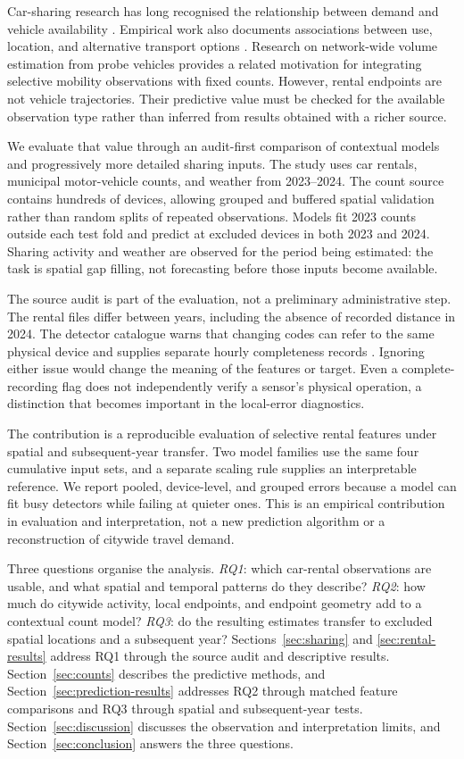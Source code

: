\documentclass{interact}
\begin{document}
Car-sharing research has long recognised the relationship between demand and vehicle availability \citep{jorge2013}. Empirical work also documents associations between use, location, and alternative transport options \citep{becker2017}. Research on network-wide volume estimation from probe vehicles \citep{eisinga2025} provides a related motivation for integrating selective mobility observations with fixed counts. However, rental endpoints are not vehicle trajectories. Their predictive value must be checked for the available observation type rather than inferred from results obtained with a richer source.

We evaluate that value through an audit-first comparison of contextual models and progressively more detailed sharing inputs. The study uses car rentals, municipal motor-vehicle counts, and weather from 2023--2024. The count source contains hundreds of devices, allowing grouped and buffered spatial validation rather than random splits of repeated observations. Models fit 2023 counts outside each test fold and predict at excluded devices in both 2023 and 2024. Sharing activity and weather are observed for the period being estimated: the task is spatial gap filling, not forecasting before those inputs become available.

The source audit is part of the evaluation, not a preliminary administrative step. The rental files differ between years, including the absence of recorded distance in 2024. The detector catalogue warns that changing codes can refer to the same physical device and supplies separate hourly completeness records \citep{bolognaLoops,bolognaAccuracy}. Ignoring either issue would change the meaning of the features or target. Even a complete-recording flag does not independently verify a sensor's physical operation, a distinction that becomes important in the local-error diagnostics.

The contribution is a reproducible evaluation of selective rental features under spatial and subsequent-year transfer. Two model families use the same four cumulative input sets, and a separate scaling rule supplies an interpretable reference. We report pooled, device-level, and grouped errors because a model can fit busy detectors while failing at quieter ones. This is an empirical contribution in evaluation and interpretation, not a new prediction algorithm or a reconstruction of citywide travel demand.

Three questions organise the analysis. \emph{RQ1}: which car-rental observations are usable, and what spatial and temporal patterns do they describe? \emph{RQ2}: how much do citywide activity, local endpoints, and endpoint geometry add to a contextual count model? \emph{RQ3}: do the resulting estimates transfer to excluded spatial locations and a subsequent year? Sections~\ref{sec:sharing} and \ref{sec:rental-results} address RQ1 through the source audit and descriptive results. Section~\ref{sec:counts} describes the predictive methods, and Section~\ref{sec:prediction-results} addresses RQ2 through matched feature comparisons and RQ3 through spatial and subsequent-year tests. Section~\ref{sec:discussion} discusses the observation and interpretation limits, and Section~\ref{sec:conclusion} answers the three questions.
\end{document}
